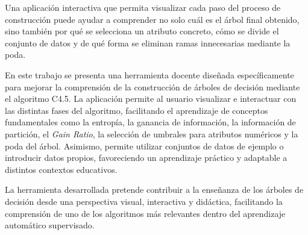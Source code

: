 Una aplicación interactiva que permita visualizar cada paso del proceso de construcción puede ayudar a comprender no solo cuál es el árbol final obtenido, sino también por qué se selecciona un atributo concreto, cómo se divide el conjunto de datos y de qué forma se eliminan ramas innecesarias mediante la poda.

En este trabajo se presenta una herramienta docente diseñada específicamente para mejorar la comprensión de la construcción de árboles de decisión mediante el algoritmo C4.5. La aplicación permite al usuario visualizar e interactuar con las distintas fases del algoritmo, facilitando el aprendizaje de conceptos fundamentales como la entropía, la ganancia de información, la información de partición, el \textit{Gain Ratio}, la selección de umbrales para atributos numéricos y la poda del árbol. Asimismo, permite utilizar conjuntos de datos de ejemplo o introducir datos propios, favoreciendo un aprendizaje práctico y adaptable a distintos contextos educativos.

La herramienta desarrollada pretende contribuir a la enseñanza de los árboles de decisión desde una perspectiva visual, interactiva y didáctica, facilitando la comprensión de uno de los algoritmos más relevantes dentro del aprendizaje automático supervisado.
